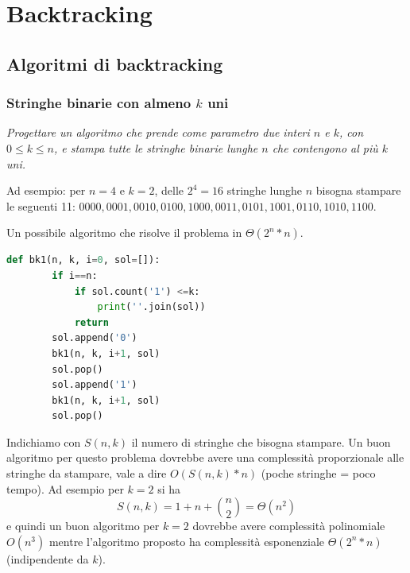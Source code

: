 \chapter{Backtracking}
\section{Algoritmi di backtracking}

%    
%

\subsection{Stringhe binarie con almeno $k$ uni}
\textit{Progettare un algoritmo che prende come parametro due interi $n$ e $k$, con $0\leq k\leq n$, e stampa tutte le stringhe binarie lunghe $n$ che contengono al più $k$ uni.}

Ad esempio: per $n=4$ e $k = 2$, delle $2^4 = 16$ stringhe lunghe $n$ bisogna stampare le seguenti 11: $0000,0001,0010,0100,1000,0011,0101,1001,0110,1010,1100$.

Un possibile algoritmo che risolve il problema in $\Theta(2^n*n)$.
\begin{lstlisting}[language=Python]
    def bk1(n, k, i=0, sol=[]):
        if i==n:
            if sol.count('1') <=k:
                print(''.join(sol))
            return
        sol.append('0')
        bk1(n, k, i+1, sol)
        sol.pop()
        sol.append('1')
        bk1(n, k, i+1, sol)
        sol.pop()
\end{lstlisting}
Indichiamo con $S(n, k)$ il numero di stringhe che bisogna stampare. Un buon algoritmo per questo problema dovrebbe avere una complessità proporzionale alle stringhe da stampare, vale a dire $O(S(n, k) * n)$ (poche stringhe = poco tempo). Ad esempio per $k = 2$ si ha
\begin{equation*}
    S(n, k) = 1 + n + \binom{n}{2} = \Theta(n ^ 2)
\end{equation*}
e quindi un buon algoritmo per $k = 2$ dovrebbe avere complessità polinomiale $O(n ^ 3)$ mentre l'algoritmo proposto ha complessità esponenziale $\Theta(2^n*n)$ (indipendente da $k$).

